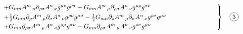 \documentclass{article}
\numberwithin{equation}{section}
\newcommand*\circled[1]{\tikz[baseline=(char.base)]{ \node[shape=circle,draw,inner sep=2pt] (char) {#1};}} %
\newcommand\f[1]{\mathopen{\hphantom{#1}}} %
\begin{document}
\begin{equation*}
\begin{split}\begin{rcases}
& \f{12} + G_{m n} A^{m}\,_{\mu} \partial_{\rho \sigma}{A^{n}\,_{\nu}} g^{\mu \nu} g^{\rho \sigma} -G_{m n} A^{m}\,_{\mu} \partial_{\rho \sigma}{A^{n}\,_{\nu}} g^{\mu \rho} g^{\sigma \nu} \f{1234567891234567}\\
& \f{12} +\frac{1}{2}G_{m n} \partial_{\rho}{A^{m}\,_{\mu}} \partial_{\sigma}{A^{n}\,_{\nu}} g^{\rho \nu} g^{\mu \sigma} - \frac{1}{2}G_{m n} \partial_{\rho}{A^{m}\,_{\mu}} \partial_{\sigma}{A^{n}\,_{\nu}} g^{\rho \sigma} g^{\mu \nu} \f{1234567891234567} \\
& \f{12} +G_{m n} \partial_{\rho \sigma}{A^{m}\,_{\mu}} A^{n}\,_{\nu} g^{\rho \mu} g^{\sigma \nu} -G_{m n} \partial_{\rho \sigma}{A^{m}\,_{\mu}} A^{n}\,_{\nu} g^{\rho \sigma} g^{\mu \nu} \f{1234567891234567}
\end{rcases}
\quad \circled{3}
\end{split}
\end{equation*}\\
\end{document}
